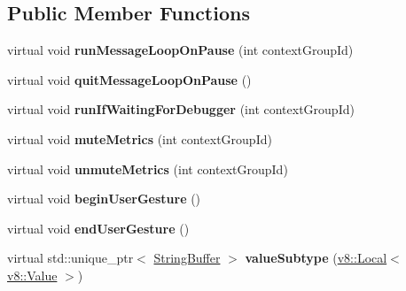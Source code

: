 \subsection*{Public Member Functions}
\begin{DoxyCompactItemize}
\item 
\mbox{\label{classv8__inspector_1_1V8InspectorClient_addb36888a924efd510be43f9af456948}} 
virtual void {\bfseries run\+Message\+Loop\+On\+Pause} (int context\+Group\+Id)
\item 
\mbox{\label{classv8__inspector_1_1V8InspectorClient_aeb0a389933779eb818e10047ceb584f8}} 
virtual void {\bfseries quit\+Message\+Loop\+On\+Pause} ()
\item 
\mbox{\label{classv8__inspector_1_1V8InspectorClient_a421ba78d7e2f2f1d4cc214d83f0fd87a}} 
virtual void {\bfseries run\+If\+Waiting\+For\+Debugger} (int context\+Group\+Id)
\item 
\mbox{\label{classv8__inspector_1_1V8InspectorClient_a3b97058f1dcc3ecfe299025d8acd0c93}} 
virtual void {\bfseries mute\+Metrics} (int context\+Group\+Id)
\item 
\mbox{\label{classv8__inspector_1_1V8InspectorClient_a283517b17f71fbeb75e0c19dde9f8189}} 
virtual void {\bfseries unmute\+Metrics} (int context\+Group\+Id)
\item 
\mbox{\label{classv8__inspector_1_1V8InspectorClient_a9ca8135c960cb9c769cf9ab85bd8cbd8}} 
virtual void {\bfseries begin\+User\+Gesture} ()
\item 
\mbox{\label{classv8__inspector_1_1V8InspectorClient_a0de728d61603c38b38062fa9eddde23e}} 
virtual void {\bfseries end\+User\+Gesture} ()
\item 
\mbox{\label{classv8__inspector_1_1V8InspectorClient_a723010fe1993d44c313480ced3a43208}} 
virtual std\+::unique\+\_\+ptr$<$ \mbox{\hyperlink{classv8__inspector_1_1StringBuffer}{String\+Buffer}} $>$ {\bfseries value\+Subtype} (\mbox{\hyperlink{classv8_1_1Local}{v8\+::\+Local}}$<$ \mbox{\hyperlink{classv8_1_1Value}{v8\+::\+Value}} $>$)

\end{DoxyCompactItemize}
